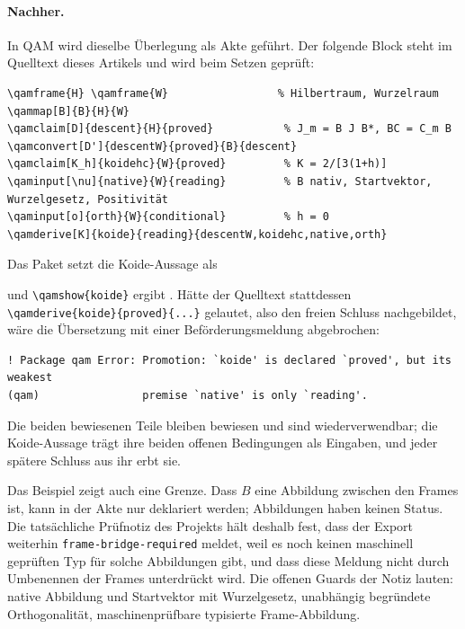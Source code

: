 \paragraph{Nachher.} In QAM wird dieselbe Überlegung als Akte geführt. Der folgende Block steht im Quelltext dieses Artikels und wird beim
Setzen geprüft:
\begin{lstlisting}
\qamframe{H} \qamframe{W}                 % Hilbertraum, Wurzelraum
\qammap[B]{B}{H}{W}
\qamclaim[D]{descent}{H}{proved}           % J_m = B J B*, BC = C_m B
\qamconvert[D']{descentW}{proved}{B}{descent}
\qamclaim[K_h]{koidehc}{W}{proved}         % K = 2/[3(1+h)]
\qaminput[\nu]{native}{W}{reading}         % B nativ, Startvektor, Wurzelgesetz, Positivität
\qaminput[o]{orth}{W}{conditional}         % h = 0
\qamderive[K]{koide}{reading}{descentW,koidehc,native,orth}
\end{lstlisting}
Das Paket setzt die Koide-Aussage als
\begin{center}\end{center}
und \verb|\qamshow{koide}| ergibt . Hätte der Quelltext stattdessen
\verb|\qamderive{koide}{proved}{...}| gelautet, also den freien Schluss nachgebildet, wäre die Übersetzung mit einer Beförderungsmeldung abgebrochen:
\begin{lstlisting}
! Package qam Error: Promotion: `koide' is declared `proved', but its weakest
(qam)                premise `native' is only `reading'.
\end{lstlisting}
Die beiden bewiesenen Teile bleiben bewiesen und sind wiederverwendbar; die Koide-Aussage trägt ihre beiden offenen Bedingungen als
Eingaben, und jeder spätere Schluss aus ihr erbt sie.

Das Beispiel zeigt auch eine Grenze. Dass \(B\) eine Abbildung zwischen den Frames ist, kann in der Akte nur deklariert werden; Abbildungen
haben keinen Status. Die tatsächliche Prüfnotiz des Projekts hält deshalb fest, dass der Export weiterhin \texttt{frame-bridge-required}
meldet, weil es noch keinen maschinell geprüften Typ für solche Abbildungen gibt, und dass diese Meldung nicht durch Umbenennen der Frames
unterdrückt wird. Die offenen Guards der Notiz lauten: native Abbildung und Startvektor mit Wurzelgesetz, unabhängig begründete
Orthogonalität, maschinenprüfbare typisierte Frame-Abbildung.

